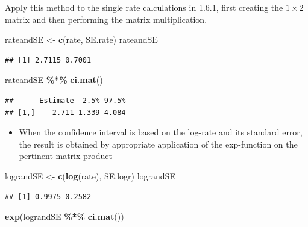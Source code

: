 \documentclass[
]{book}
\newenvironment{Shaded}{\begin{snugshade}}{\end{snugshade}}
\newcommand{\FunctionTok}[1]{\textcolor[rgb]{0.13,0.29,0.53}{\textbf{#1}}}
\newcommand{\NormalTok}[1]{#1}
\newcommand{\OtherTok}[1]{\textcolor[rgb]{0.56,0.35,0.01}{#1}}
\newcommand{\SpecialCharTok}[1]{\textcolor[rgb]{0.81,0.36,0.00}{\textbf{#1}}}
\providecommand{\tightlist}{%
  \setlength{\itemsep}{0pt}\setlength{\parskip}{0pt}}
\theoremstyle{definition}
\theoremstyle{definition}
\theoremstyle{definition}
\theoremstyle{definition}
\theoremstyle{remark}
\begin{document}
Apply this method to the single rate calculations in 1.6.1, first creating the \(1 \times 2\) matrix and then performing the matrix multiplication.

\begin{Shaded}
\begin{Highlighting}[]
\NormalTok{rateandSE }\OtherTok{\textless{}{-}} \FunctionTok{c}\NormalTok{(rate, SE.rate)}
\NormalTok{rateandSE}
\end{Highlighting}
\end{Shaded}

\begin{verbatim}
## [1] 2.7115 0.7001
\end{verbatim}

\begin{Shaded}
\begin{Highlighting}[]
\NormalTok{rateandSE }\SpecialCharTok{\%*\%} \FunctionTok{ci.mat}\NormalTok{()}
\end{Highlighting}
\end{Shaded}

\begin{verbatim}
##      Estimate  2.5% 97.5%
## [1,]    2.711 1.339 4.084
\end{verbatim}

\begin{itemize}
\tightlist
\item
  When the confidence interval is based on the log-rate and its
  standard error, the result is obtained by appropriate application of
  the exp-function on the pertinent matrix product
\end{itemize}

\begin{Shaded}
\begin{Highlighting}[]
\NormalTok{lograndSE }\OtherTok{\textless{}{-}} \FunctionTok{c}\NormalTok{(}\FunctionTok{log}\NormalTok{(rate), SE.logr)}
\NormalTok{lograndSE}
\end{Highlighting}
\end{Shaded}

\begin{verbatim}
## [1] 0.9975 0.2582
\end{verbatim}

\begin{Shaded}
\begin{Highlighting}[]
\FunctionTok{exp}\NormalTok{(lograndSE }\SpecialCharTok{\%*\%} \FunctionTok{ci.mat}\NormalTok{())}
\end{Highlighting}
\end{Shaded}
\end{document}
